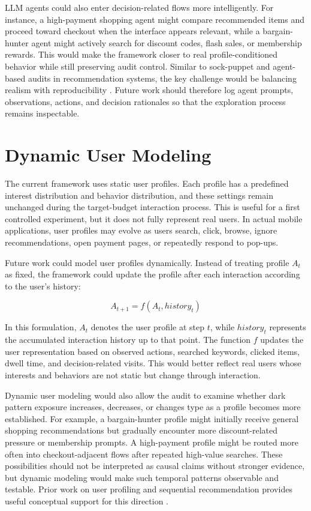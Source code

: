 LLM agents could also enter decision-related flows more intelligently. For instance, a high-payment shopping agent might compare recommended items and proceed toward checkout when the interface appears relevant, while a bargain-hunter agent might actively search for discount codes, flash sales, or membership rewards. This would make the framework closer to real profile-conditioned behavior while still preserving audit control. Similar to sock-puppet and agent-based audits in recommendation systems, the key challenge would be balancing realism with reproducibility \cite{srba2023youtube,haroon2023youtubeaudit}. Future work should therefore log agent prompts, observations, actions, and decision rationales so that the exploration process remains inspectable.

\section{Dynamic User Modeling}

The current framework uses static user profiles. Each profile has a predefined interest distribution and behavior distribution, and these settings remain unchanged during the target-budget interaction process. This is useful for a first controlled experiment, but it does not fully represent real users. In actual mobile applications, user profiles may evolve as users search, click, browse, ignore recommendations, open payment pages, or repeatedly respond to pop-ups.

Future work could model user profiles dynamically. Instead of treating profile \(A_t\) as fixed, the framework could update the profile after each interaction according to the user’s history:

\[
A_{t+1} = f(A_t, history_t)
\]

In this formulation, \(A_t\) denotes the user profile at step \(t\), while \(history_t\) represents the accumulated interaction history up to that point. The function \(f\) updates the user representation based on observed actions, searched keywords, clicked items, dwell time, and decision-related visits. This would better reflect real users whose interests and behaviors are not static but change through interaction.

Dynamic user modeling would also allow the audit to examine whether dark pattern exposure increases, decreases, or changes type as a profile becomes more established. For example, a bargain-hunter profile might initially receive general shopping recommendations but gradually encounter more discount-related pressure or membership prompts. A high-payment profile might be routed more often into checkout-adjacent flows after repeated high-value searches. These possibilities should not be interpreted as causal claims without stronger evidence, but dynamic modeling would make such temporal patterns observable and testable. Prior work on user profiling and sequential recommendation provides useful conceptual support for this direction \cite{purificato2024usermodeling,lian2021multiinterest,hou2022unisrec}.

